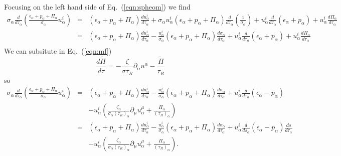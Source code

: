 \documentclass[aps,article]{revtex4}
\begin{document}
Focusing on the left hand side of Eq.\ (\ref{eqn:spheom}) we find
\begin{eqnarray}
\sigma_{\alpha}\frac{d}{d\tau_{\alpha}}\left(\frac{\epsilon_{\alpha} +p_{\alpha}+\Pi_{\alpha}}{\sigma_{\alpha}}u^{i}_{\alpha}\right)&=&\left(\epsilon_{\alpha} +p_{\alpha}+\Pi_{\alpha}\right)\frac{du^{i}_{\alpha}}{d\tau_{\alpha}}+\sigma_{\alpha} u^i_{\alpha} \left(\epsilon_{\alpha} +p_{\alpha}+\Pi_{\alpha}\right) \frac{d}{d\tau_{\alpha}}\left(\frac{1}{\sigma_{\alpha}}\right) +u^i_{\alpha}     \frac{d}{d\tau_{\alpha}}\left(\epsilon_{\alpha} +p_{\alpha}\right) +  u^i_{\alpha}     \frac{d\Pi_{\alpha}}{d\tau_{\alpha}}\nonumber\\
&=&\left(\epsilon_{\alpha} +p_{\alpha}+\Pi_{\alpha}\right)\frac{du^{i}_{\alpha}}{d\tau_{\alpha}}- \frac{u^i_{\alpha}}{\sigma_{\alpha}} \left(\epsilon_{\alpha} +p_{\alpha}+\Pi_{\alpha}\right) \frac{d\sigma_{\alpha}}{d\tau_{\alpha}} +u^i_{\alpha}     \frac{d}{d\tau_{\alpha}}\left(\epsilon_{\alpha} +p_{\alpha}\right) +  u^i_{\alpha}     \frac{d\Pi_{\alpha}}{d\tau_{\alpha}}\nonumber\\
\end{eqnarray}
We can subsitute in Eq.\ (\ref{eqn:mf})
\begin{equation}
\frac{d\tilde{\Pi}}{d\tau}=-\frac{\zeta}{\sigma\tau_R}\partial_{\alpha}u^{\alpha}-\frac{\tilde{\Pi}}{\tau_R}
\end{equation}
so
\begin{eqnarray}
\sigma_{\alpha}\frac{d}{d\tau_{\alpha}}\left(\frac{\epsilon_{\alpha} +p_{\alpha}+\Pi_{\alpha}}{\sigma_{\alpha}}u^{i}_{\alpha}\right)
&=&\left(\epsilon_{\alpha} +p_{\alpha}+\Pi_{\alpha}\right)\frac{du^{i}_{\alpha}}{d\tau_{\alpha}}- \frac{u^i_{\alpha}}{\sigma_{\alpha}} \left(\epsilon_{\alpha} +p_{\alpha}+\Pi_{\alpha}\right) \frac{d\sigma_{\alpha}}{d\tau_{\alpha}} +u^i_{\alpha}     \frac{d}{d\tau_{\alpha}}\left(\epsilon_{\alpha} -p_{\alpha}\right) \nonumber\\
& &-  u^i_{\alpha}    \left(\frac{\zeta_{\alpha}}{\sigma_{\alpha}(\tau_R)_{\alpha}}\partial_{\mu}u^{\mu}_{\alpha}+\frac{\Pi_{\alpha}}{(\tau_R)_{\alpha}}\right)\nonumber\\
&=&\left(\epsilon_{\alpha} +p_{\alpha}+\Pi_{\alpha}\right)\frac{du^{i}_{\alpha}}{d\tau_{\alpha}}- \frac{u^i_{\alpha}}{\sigma_{\alpha}} \left(\epsilon_{\alpha} +p_{\alpha}+\Pi_{\alpha}\right) \frac{d\sigma_{\alpha}}{d\tau_{\alpha}} +u^i_{\alpha}     \frac{d}{ds_{\alpha}}\left(\epsilon_{\alpha} -p_{\alpha}\right)\frac{ds}{d\tau_{\alpha}} \nonumber\\
&& - u^i_{\alpha}     \left(\frac{\zeta_{\alpha}}{\sigma_{\alpha}(\tau_R)_{\alpha}}\partial_{\mu}u^{\mu}_{\alpha}+\frac{\Pi_{\alpha}}{(\tau_R)_{\alpha}}\right).
\end{eqnarray}
\end{document}
